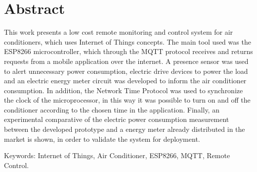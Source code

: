 \chapter*{Abstract}
\thispagestyle{empty}


This work presents a low cost remote monitoring and control system
for air conditioners, which uses Internet of Things concepts. The main tool used was the ESP8266 microcontroller, which through the MQTT protocol receives and returns requests from a mobile application over the internet. A presence sensor was used to alert unnecessary power consumption, electric drive devices to power the load and an electric energy meter circuit was developed to inform the air conditioner consumption. In addition, the Network Time Protocol was used to synchronize the clock of the microprocessor, in this way it was possible to turn on and off the conditioner according to the chosen time in the application. Finally, an experimental comparative of the electric power consumption measurement between the developed prototype and a energy meter already distributed in the market is shown, in order to validate the system for deployment.


\noindent \textsf{Keywords:} Internet of Things, Air Conditioner, ESP8266, MQTT, Remote Control.

\cleardoublepage
